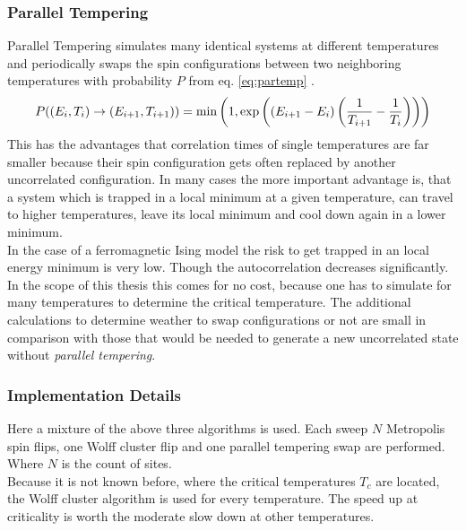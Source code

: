     \subsubsection{Parallel Tempering}
        Parallel Tempering\cite{ParallelTempering1986} simulates many identical systems at different
        temperatures and periodically swaps the spin configurations
        between two neighboring temperatures with probability \(P\) from
        eq. \eqref{eq:partemp} \cite[S. ??]{NewmanBarkema1999} \cite[S. 155ff]{Katzgraber2011}.
        \begin{equation}
            P((E_i,T_i) \to (E_{i+1},T_{i+1})) = \min\left(1,\exp\left(\left(E_{i+1}-E_i\right)\left(\frac{1}{T_{i+1}}-\frac{1}{T_i}\right)\right)\right)
            \label{eq:partemp}
        \end{equation}
        This has the advantages that correlation times of single
        temperatures are far smaller because their spin configuration
        gets often replaced by another uncorrelated configuration. In
        many cases the more important advantage is, that a system which
        is trapped in a local minimum at a given temperature, can travel
        to higher temperatures, leave its local minimum and cool down
        again in a lower minimum.\\
        In the case of a ferromagnetic Ising model the risk to get trapped
        in an local energy minimum is very low. Though the autocorrelation
        decreases significantly. In the scope of this thesis this comes
        for no cost, because one has to simulate for many temperatures
        to determine the critical temperature. The additional calculations
        to determine weather to swap configurations or not are small in
        comparison with those that would be needed to generate a new
        uncorrelated state without \emph{parallel tempering}.

    \subsubsection{Implementation Details}
        Here a mixture of the above three algorithms is used.
        Each sweep \(N\) Metropolis spin flips, one Wolff cluster flip
        and one parallel tempering swap are performed. Where \(N\) is the
        count of sites.\\
        Because it is not known before, where the critical temperatures
        \(T_c\) are located, the Wolff cluster algorithm is used for
        every temperature. The speed up at criticality is worth the
        moderate slow down at other temperatures.

